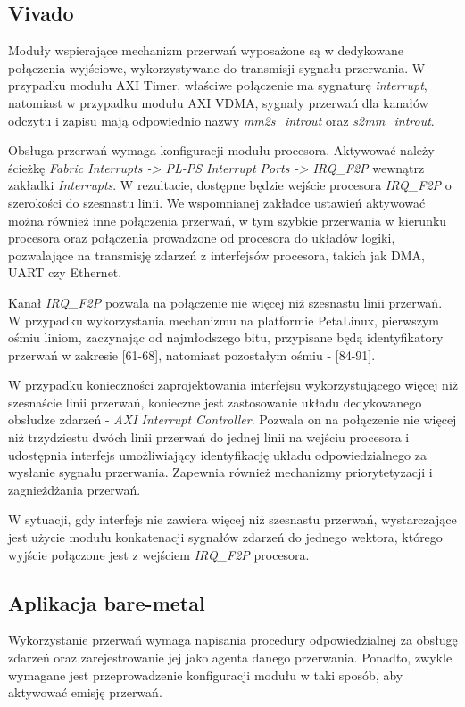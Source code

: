 \subsection{Vivado}
Moduły wspierające mechanizm przerwań wyposażone są w dedykowane połączenia wyjściowe, wykorzystywane do transmisji sygnału przerwania. W przypadku modułu AXI Timer, właściwe połączenie ma sygnaturę \emph{interrupt}, natomiast w przypadku modułu AXI VDMA, sygnały przerwań dla kanałów odczytu i zapisu mają odpowiednio nazwy \emph{mm2s\_introut} oraz \emph{s2mm\_introut}.

Obsługa przerwań wymaga konfiguracji modułu procesora. Aktywować należy ścieżkę \emph{Fabric Interrupts -> PL-PS Interrupt Ports -> IRQ\_F2P} wewnątrz zakładki \emph{Interrupts}. W rezultacie, dostępne będzie wejście procesora \emph{IRQ\_F2P} o szerokości do szesnastu linii. We wspomnianej zakładce ustawień aktywować można również inne połączenia przerwań, w tym szybkie przerwania w kierunku procesora oraz połączenia prowadzone od procesora do układów logiki, pozwalające na transmisję zdarzeń z interfejsów procesora, takich jak DMA, UART czy Ethernet.

Kanał \emph{IRQ\_F2P} pozwala na połączenie nie więcej niż szesnastu linii przerwań. W przypadku wykorzystania mechanizmu na platformie PetaLinux, pierwszym ośmiu liniom, zaczynając od najmłodszego bitu, przypisane będą identyfikatory przerwań w zakresie [61-68], natomiast pozostałym ośmiu - [84-91].

W przypadku konieczności zaprojektowania interfejsu wykorzystującego więcej niż szesnaście linii przerwań, konieczne jest zastosowanie układu dedykowanego obsłudze zdarzeń - \emph{AXI Interrupt Controller}. Pozwala on na połączenie nie więcej niż trzydziestu dwóch linii przerwań do jednej linii na wejściu procesora i udostępnia interfejs umożliwiający identyfikację układu odpowiedzialnego za wysłanie sygnału przerwania. Zapewnia również mechanizmy priorytetyzacji i zagnieżdżania przerwań.

W sytuacji, gdy interfejs nie zawiera więcej niż szesnastu przerwań, wystarczające jest użycie modułu konkatenacji sygnałów zdarzeń do jednego wektora, którego wyjście połączone jest z wejściem \emph{IRQ\_F2P} procesora.

\subsection{Aplikacja bare-metal}
Wykorzystanie przerwań wymaga napisania procedury odpowiedzialnej za obsługę zdarzeń oraz zarejestrowanie jej jako agenta danego przerwania. Ponadto, zwykle wymagane jest przeprowadzenie konfiguracji modułu w taki sposób, aby aktywować emisję przerwań.

